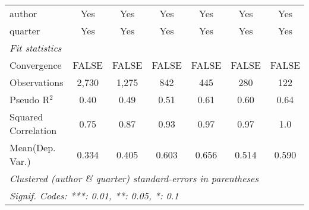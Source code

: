 \begin{tabular}{lcccccc}
   author                                                     & Yes           & Yes           & Yes           & Yes           & Yes            & Yes\\  
   quarter                                                    & Yes           & Yes           & Yes           & Yes           & Yes            & Yes\\  
   \midrule
   \emph{Fit statistics}\\
   Convergence                                                &FALSE          & FALSE         & FALSE         & FALSE         & FALSE          & FALSE\\  
   Observations                                               & 2,730         & 1,275         & 842           & 445           & 280            & 122\\  
   Pseudo R$^2$                                               & 0.40          & 0.49          & 0.51          & 0.61          & 0.60           & 0.64\\  
   Squared Correlation                                        & 0.75          & 0.87          & 0.93          & 0.97          & 0.97           & 1.0\\  
Mean(Dep. Var.) & 0.334 & 0.405 & 0.603 & 0.656 & 0.514 & 0.590 \\
   \midrule \midrule
   \multicolumn{7}{l}{\emph{Clustered (author \& quarter) standard-errors in parentheses}}\\
   \multicolumn{7}{l}{\emph{Signif. Codes: ***: 0.01, **: 0.05, *: 0.1}}\\
\end{tabular}
\par\endgroup
